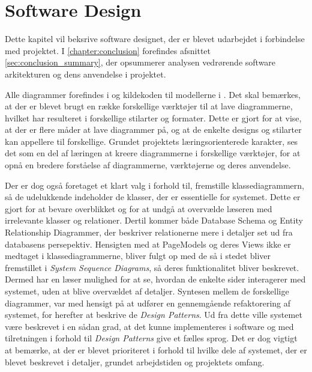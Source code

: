 \chapter{Software Design}
\label{chapter:software-design}
Dette kapitel vil beksrive software designet, der er blevet udarbejdet i forbindelse med projektet.
I \ref{chapter:conclusion} forefindes afsnittet \ref{sec:conclusion_summary}, der opsummerer analysen vedrørende software arkitekturen og dens anvendelse i projektet.

Alle diagrammer forefindes i  og kildekoden til modellerne i .
Det skal bemærkes, at der er blevet brugt en række forskellige værktøjer til at lave diagrammerne, hvilket har resulteret i forskellige stilarter og formater. 
Dette er gjort for at vise, at der er flere måder at lave diagrammer på, og at de enkelte designs og stilarter kan appellere til forskellige.
Grundet projektets læringsorienterede karakter, ses det som en del af læringen at kreere diagrammerne i forskellige værktøjer, for at opnå en bredere forståelse af diagrammerne, værktøjerne og deres anvendelse.

Der er dog også foretaget et klart valg i forhold til, fremstille klassediagrammern, så de udelukkende indeholder de klasser, der er essentielle for systemet.
Dette er gjort for at bevare overblikket og for at undgå at overvælde læseren med irrelevante klasser og relationer.
Dertil kommer både Database Schema og Entity Relationship Diagrammer, der beskriver relationerne mere i detaljer set ud fra databasens persepektiv.
Hensigten med at PageModels og deres Views ikke er medtaget i klassediagrammerne, bliver fulgt op med de så i stedet bliver fremstillet i \emph{System Sequence Diagrams}, så deres funktionalitet bliver beskrevet.
Dermed har en læser mulighed for at se, hvordan de enkelte sider interagerer med systemet, uden at blive overvældet af detaljer.
Syntesen mellem de forskellige diagrammer, var med hensigt på at udfører en gennemgående refaktorering af systemet, for herefter at beskrive de \emph{Design Patterns}.
Ud fra dette ville systemet være beskrevet i en sådan grad, at det kunne implementeres i software og med tilretningen i forhold til \emph{Design Patterns} give et fælles sprog.
Det er dog vigtigt at bemærke, at der er blevet prioriteret i forhold til hvilke dele af systemet, der er blevet beskrevet i detaljer, grundet arbejdstiden og projektets omfang.

